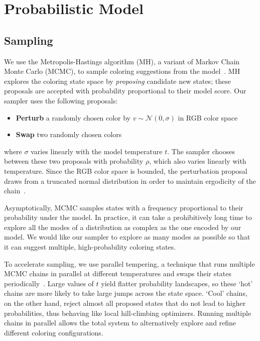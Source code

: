 \section{Probabilistic Model}
\label{sec:model}






\subsection{Sampling}
\label{sec:sampling}

We use the Metropolis-Hastings algorithm (MH), a variant of Markov Chain Monte Carlo (MCMC), to sample coloring suggestions from the model~\cite{Metropolis,Hastings}. MH explores the coloring state space by \emph{proposing} candidate new states; these proposals are accepted with probability proportional to their model score. Our sampler uses the following proposals:
\begin{itemize}
	\item{\textbf{Perturb} a randomly chosen color by $v \sim \mathcal{N}(0, \sigma)$ in RGB color space}
	\item{\textbf{Swap} two randomly chosen colors}
\end{itemize}
where $\sigma$ varies linearly with the model temperature $t$. The sampler chooses between these two proposals with probability $\rho$, which also varies linearly with temperature. Since the RGB color space is bounded, the perturbation proposal draws from a truncated normal distribution in order to maintain ergodicity of the chain~\cite{TruncatedGaussians}.

Asymptotically, MCMC samples states with a frequency proportional to their probability under the model. In practice, it can take a prohibitively long time to explore all the modes of a distribution as complex as the one encoded by our model. We would like our sampler to explore as many modes as possible so that it can suggest multiple, high-probability coloring states.

To accelerate sampling, we use parallel tempering, a technique that runs multiple MCMC chains in parallel at different temperatures and swaps their states periodically~\cite{ParallelTempering}. Large values of $t$ yield flatter probability landscapes, so these `hot' chains are more likely to take large jumps across the state space. `Cool' chains, on the other hand, reject almost all proposed states that do not lead to higher probabilities, thus behaving like local hill-climbing optimizers. Running multiple chains in parallel allows the total system to alternatively explore and refine different coloring configurations.

